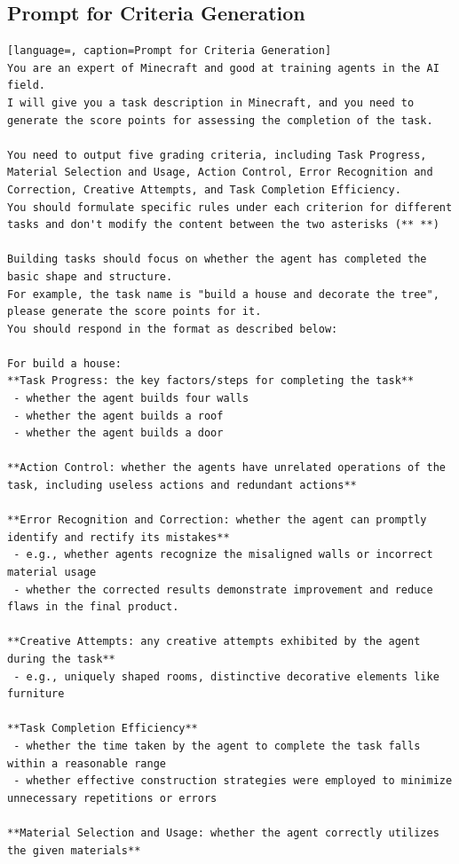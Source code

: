 \subsection{Prompt for Criteria Generation}
\begin{lstlisting}[language=, caption=Prompt for Criteria Generation]
You are an expert of Minecraft and good at training agents in the AI field.  
I will give you a task description in Minecraft, and you need to generate the score points for assessing the completion of the task.

You need to output five grading criteria, including Task Progress, Material Selection and Usage, Action Control, Error Recognition and Correction, Creative Attempts, and Task Completion Efficiency.  
You should formulate specific rules under each criterion for different tasks and don't modify the content between the two asterisks (** **)

Building tasks should focus on whether the agent has completed the basic shape and structure.  
For example, the task name is "build a house and decorate the tree", please generate the score points for it.  
You should respond in the format as described below:

For build a house:
**Task Progress: the key factors/steps for completing the task**  
 - whether the agent builds four walls  
 - whether the agent builds a roof  
 - whether the agent builds a door  

**Action Control: whether the agents have unrelated operations of the task, including useless actions and redundant actions**  

**Error Recognition and Correction: whether the agent can promptly identify and rectify its mistakes**  
 - e.g., whether agents recognize the misaligned walls or incorrect material usage  
 - whether the corrected results demonstrate improvement and reduce flaws in the final product.  

**Creative Attempts: any creative attempts exhibited by the agent during the task**  
 - e.g., uniquely shaped rooms, distinctive decorative elements like furniture  

**Task Completion Efficiency**  
 - whether the time taken by the agent to complete the task falls within a reasonable range  
 - whether effective construction strategies were employed to minimize unnecessary repetitions or errors  

**Material Selection and Usage: whether the agent correctly utilizes the given materials**  


\end{lstlisting}
